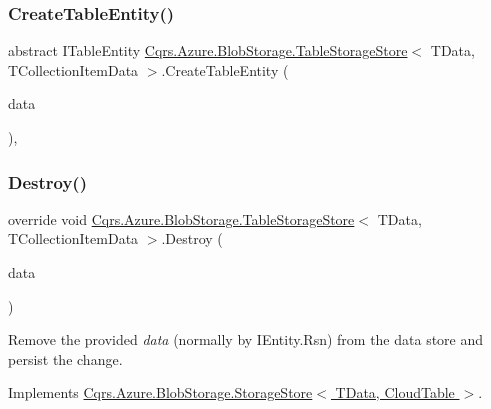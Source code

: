 \subsubsection{\texorpdfstring{Create\+Table\+Entity()}{CreateTableEntity()}}
{\footnotesize\ttfamily abstract I\+Table\+Entity \hyperlink{classCqrs_1_1Azure_1_1BlobStorage_1_1TableStorageStore}{Cqrs.\+Azure.\+Blob\+Storage.\+Table\+Storage\+Store}$<$ T\+Data, T\+Collection\+Item\+Data $>$.Create\+Table\+Entity (\begin{DoxyParamCaption}\item[{T\+Collection\+Item\+Data}]{data }\end{DoxyParamCaption})\hspace{0.3cm}{\ttfamily [protected]}, {}}

\mbox{\label{classCqrs_1_1Azure_1_1BlobStorage_1_1TableStorageStore_a1ad02e710a3fe1d794d99db332c351dc_a1ad02e710a3fe1d794d99db332c351dc}} 
\subsubsection{\texorpdfstring{Destroy()}{Destroy()}\hspace{0.1cm}{\footnotesize\ttfamily [1/2]}}
{\footnotesize\ttfamily override void \hyperlink{classCqrs_1_1Azure_1_1BlobStorage_1_1TableStorageStore}{Cqrs.\+Azure.\+Blob\+Storage.\+Table\+Storage\+Store}$<$ T\+Data, T\+Collection\+Item\+Data $>$.Destroy (\begin{DoxyParamCaption}\item[{T\+Data}]{data }\end{DoxyParamCaption})\hspace{0.3cm}{\ttfamily [virtual]}}



Remove the provided {\itshape data}  (normally by I\+Entity.\+Rsn) from the data store and persist the change. 



Implements \hyperlink{classCqrs_1_1Azure_1_1BlobStorage_1_1StorageStore_a9879b4ab18c2a33d7e20bc0b3a734195_a9879b4ab18c2a33d7e20bc0b3a734195}{Cqrs.\+Azure.\+Blob\+Storage.\+Storage\+Store$<$ T\+Data, Cloud\+Table $>$}.

